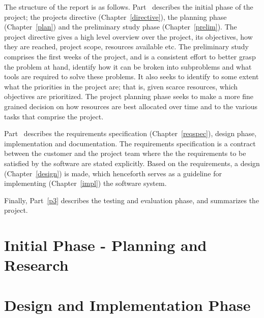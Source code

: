 \documentclass[11pt]{book}
\begin{document}
The structure of the report is as follows. Part~\ref{p1} describes the initial phase of the project; the projects directive (Chapter~\ref{directive}), the planning phase (Chapter~\ref{plan}) and the preliminary study phase (Chapter~\ref{prelim}). The project directive gives a high level overview over the project, its objectives, how they are reached, project scope, resources available etc. The preliminary study comprises the first weeks of the project, and is a consistent effort to better grasp the problem at hand, identify how it can be broken into subproblems and what tools are required to solve these problems. It also seeks to identify to some extent what the priorities in the project are; that is, given scarce resources, which objectives are prioritized. The project planning phase seeks to make a more fine grained decision on how resources are best allocated over time and to the various tasks that comprise the project.

Part~\ref{p2} describes the requirements specification (Chapter~\ref{reqspec}), design phase, implementation and documentation. The requirements specification is a contract between the customer and the project team where the the requirements to be satisfied by the software are stated explicitly. Based on the requirements, a design (Chapter~\ref{design}) is made, which henceforth serves as a guideline for implementing (Chapter~\ref{impl}) the software system.

Finally, Part~\ref{p3} describes the testing and evaluation phase, and summarizes the project. 

\part{Initial Phase - Planning and Research}\label{p1}
\addtocounter{chapter}{1}
\setcounter{section}{0}


\setcounter{section}{0}
\addtocounter{chapter}{1}


\setcounter{section}{0}
\addtocounter{chapter}{1}


\part{Design and Implementation Phase}\label{p2}
\setcounter{section}{0}
\addtocounter{chapter}{1}


\setcounter{section}{0}
\addtocounter{chapter}{1}

\end{document}
